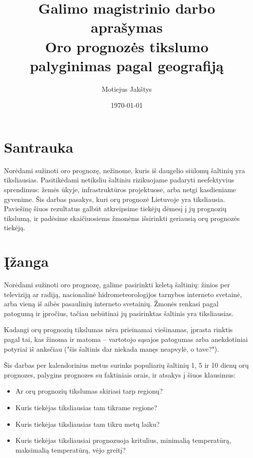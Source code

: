 \documentclass{article}
\title{Galimo magistrinio darbo aprašymas\\ \vspace{4mm} 
Oro prognozės tikslumo palyginimas pagal geografiją}
\author{Motiejus Jakštys}
\date{\today}
\begin{document}
\maketitle

\section{Santrauka}

Norėdami sužinoti oro prognozę, nežinome, kuris iš daugelio siūlomų šaltinių
yra tiksliausias. Pasitikėdami netiksliu šaltiniu rizikuojame padaryti
neefektyvius sprendimus: žemės ūkyje, infrastruktūros projektuose, arba netgi
kasdieniame gyvenime. Šis darbas pasakys, kuri orų prognozė Lietuvoje yra
tiksliausia. Paviešinę šiuos rezultatus galbūt atkreipsime tiekėjų dėmesį į jų
prognozių tikslumą, ir padėsime skaičiuosiems žmonėms išsirinkti geriausią orų
prognozės tiekėją.

\section{Įžanga}

Norėdami sužinoti oro prognozę, galime pasirinkti keletą šaltinių: žinios per
televiziją ar radiją, nacionalinė hidrometeorologijos tarnybos interneto
svetainė, arba vieną iš aibės pasaulinių interneto svetainių. Žmonės renkasi
pagal patogumą ir įpročius, tačiau nebūtinai jų pasirinktas šaltinis yra
tiksliausias.

Kadangi orų prognozių tikslumas nėra prieinamai viešinamas, įprasta rinktis
pagal tai, kas žinoma ir matoma -- vartotojo sąsajos patogumas arba
anekdotiniai potyriai iš anksčiau ("šis šaltinis dar niekada manęs neapvylė, o
tave?").

Šis darbas per kalendorinius metus surinks populiarių šaltinių 1, 5 ir 10 dienų
orų prognozes, palygins prognozes su faktiniais orais, ir atsakys į šiuos
klausimus:

\begin{itemize}
    \item Ar orų prognozių tikslumas skiriasi tarp regionų?
    \item Kuris tiekėjas tiksliausias tam tikrame regione?
    \item Kuris tiekėjas tiksliausias tam tikru metų laiku?
    \item Kuris tiekėjas tiksliausiai prognozuoja kritulius, minimalią
        temperatūrą, maksimalią temperatūrą, vėjo greitį?
\end{itemize}
\end{document}
